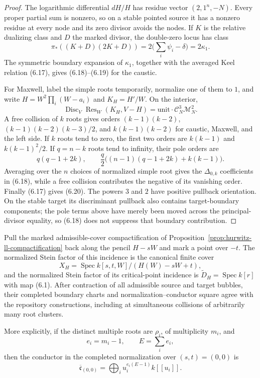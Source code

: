 \begin{proof}
The logarithmic differential $dH/H$ has residue vector
$(2,1^n,-N)$.  Every proper partial sum is nonzero, so on a stable pointed
source it has a nonzero residue at every node and its zero divisor avoids the
nodes.  If $K$ is the relative dualizing class and $D$ the marked divisor,
the double-zero locus has class
\[
 \pi_*((K+D)(2K+D))
 =2\bigl(\sum_i\psi_i-\delta\bigr)=2\kappa_1.
\]
The symmetric boundary expansion of $\kappa_1$, together with the averaged
Keel relation (6.17), gives (6.18)--(6.19) for the caustic.

For Maxwell, label the simple roots temporarily, normalize one of them to
$1$, and write $H=W^2\prod_i(W-a_i)$ and $K_H=H'/W$.  On the interior,
\[
 \operatorname{Disc}_V\operatorname{Res}_W(K_H,V-H)
 =\text{unit}\cdot\mathcal C_N^3\mathcal M_N^2.
\]
A free collision of $k$ roots gives orders
$(k-1)(k-2)$, $(k-1)(k-2)(k-3)/2$, and $k(k-1)(k-2)$
for caustic, Maxwell, and the left side.  If $k$ roots tend to zero, the
first two orders are $k(k-1)$ and $k(k-1)^2/2$.  If $q=n-k$ roots tend to
infinity, their pole orders are
\[
 q(q-1+2k),\qquad
 \frac q2\bigl((n-1)(q-1+2k)+k(k-1)\bigr).
\]
Averaging over the $n$ choices of normalized simple root gives the
$\Delta_{0,k}$ coefficients in (6.18), while a free collision contributes
the negative of its vanishing order.  Finally (6.17) gives (6.20).
The powers $3$ and $2$ have positive pullback orientation.  On the stable
target its discriminant pullback also contains target-boundary components;
the pole terms above have merely been moved across the principal-divisor
equality, so (6.18) does not suppress that boundary contribution.
\end{proof}

\begin{theorem}
\label{thm:admissible-formal-comparison}
Pull the marked admissible-cover compactification of
Proposition~\ref{prop:hurwitz-ll-compactification} back along the pencil
$H-sW$ and mark a point over $-t$.  The normalized Stein factor of this
incidence is the canonical finite cover
\[
 X_H=\operatorname{Spec}k[s,t,W]/(H(W)-sW+t),
\]
and the normalized Stein factor of its critical-point incidence is
$\widetilde D_H=\operatorname{Spec}k[r]$ with map (6.1).  After contraction
of all admissible source and target bubbles, their completed boundary charts
and normalization--conductor square agree with the repository constructions,
including at simultaneous collisions of arbitrarily many root clusters.

More explicitly, if the distinct multiple roots are $\rho_i$, of
multiplicity $m_i$, and
\[
 e_i=m_i-1,\qquad E=\sum_i e_i,
\]
then the conductor in the completed normalization over $(s,t)=(0,0)$ is
\[
 \overline{\mathfrak c}_{(0,0)}
 =\bigoplus_i u_i^{e_i(E-1)}k[[u_i]].                 \tag{6.21}
\]
\end{theorem}

